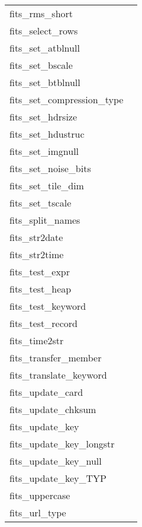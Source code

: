 \documentclass[11pt]{book}
\begin{document}
\begin{tabular}{lr}
fits\_rms\_short      & \pageref{imageRMS} \\
fits\_select\_rows  & \pageref{ffsrow} \\
fits\_set\_atblnull   & \pageref{ffsnul} \\
fits\_set\_bscale     & \pageref{ffpscl} \\
fits\_set\_btblnull   & \pageref{fftnul} \\
fits\_set\_compression\_type  & \pageref{ffsetcomp} \\
fits\_set\_hdrsize    & \pageref{ffhdef} \\
fits\_set\_hdustruc   & \pageref{ffrdef} \\
fits\_set\_imgnull    & \pageref{ffpnul} \\
fits\_set\_noise\_bits  & \pageref{ffsetcomp} \\
fits\_set\_tile\_dim  & \pageref{ffsetcomp} \\
fits\_set\_tscale     & \pageref{fftscl} \\
fits\_split\_names    & \pageref{splitnames} \\
fits\_str2date        & \pageref{ffdt2s} \\
fits\_str2time        & \pageref{ffdt2s} \\
fits\_test\_expr      & \pageref{fftexp} \\
fits\_test\_heap      & \pageref{fftheap} \\
fits\_test\_keyword   & \pageref{fftkey} \\
fits\_test\_record    & \pageref{fftrec} \\
fits\_time2str  & \pageref{ffdt2s} \\
fits\_transfer\_member  & \pageref{ffgmtf} \\
fits\_translate\_keyword & \pageref{translatekey} \\
fits\_update\_card       & \pageref{ffucrd} \\
fits\_update\_chksum  & \pageref{ffupck} \\
fits\_update\_key        & \pageref{ffuky} \\
fits\_update\_key\_longstr   & \pageref{ffukyx} \\
fits\_update\_key\_null   & \pageref{ffukyu} \\
fits\_update\_key\_TYP    & \pageref{ffukyx} \\
fits\_uppercase      & \pageref{ffupch} \\
fits\_url\_type      & \pageref{ffurlt} \\

\end{tabular}
\end{document}
